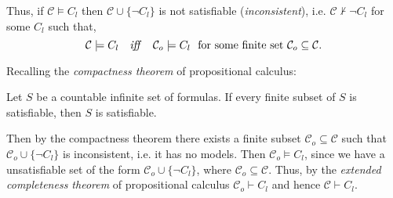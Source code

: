 {	Thus, if $\mathcal{C}\models C_{l}$ then $\mathcal{C}\cup \{\lnot C_{l}\}$
	is not satisfiable (\textit{inconsistent}), i.e. $\mathcal{C}\nvdash \lnot
	C_{l}$ for some $C_{l}$ such that,%
	\begin{equation*}
	\mathcal{C}\models C_{l}\text{\quad \textit{iff\quad }}\mathcal{C}%
	_{o}\models C_{l}\text{ \ for some finite set }\mathcal{C}_{o}\subseteq 
	\mathcal{C}.
	\end{equation*}

	Recalling the \textit{compactness theorem} of propositional calculus:

	\begin{definition}
	Let $S$ be a countable infinite set of formulas. If every finite subset of $S$ is satisfiable,
	then $S$ is satisfiable.
	\label{def:compact_thm}
	\end{definition}

	Then by the compactness theorem there exists a finite subset $\mathcal{C}%
	_{o}\subseteq \mathcal{C}$ such that $\mathcal{C}_{o}\cup \{\lnot C_{l}\}$
	is inconsistent, i.e. it has no models. Then $\mathcal{C}_{o}\models C_{l}$,
	since we have a unsatisfiable set of the form $\mathcal{C}_{o}\cup \{\lnot
	C_{l}\}$, where $\mathcal{C}_{o}\subseteq \mathcal{C}$. Thus, by the \textit{%
	extended completeness theorem} of propositional calculus $\mathcal{C}%
	_{o}\vdash C_{l}$ and hence $\mathcal{C}\vdash C_{l}$.

	\bigskip
}
